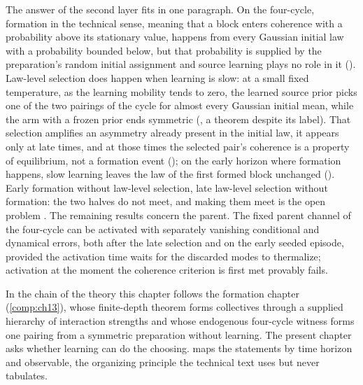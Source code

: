 The answer of the second layer fits in one paragraph. On the four-cycle, formation in the technical
sense, meaning that a block enters coherence with a probability above its stationary value, happens
from every Gaussian initial law with a probability bounded below, but that probability is supplied by
the preparation's random initial assignment and source learning plays no role in it
(). Law-level selection does happen when learning is slow: at a
small fixed temperature, as the learning mobility tends to zero, the learned source prior picks one of
the two pairings of the cycle for almost every Gaussian initial mean, while the arm with a frozen prior
ends symmetric (, a theorem despite its label). That selection
amplifies an asymmetry already present in the initial law, it appears only at late times, and at those
times the selected pair's coherence is a property of equilibrium, not a formation event
(); on the early horizon where formation happens, slow learning
leaves the law of the first formed block unchanged (). Early formation
without law-level selection, late law-level selection without formation: the two halves do not meet,
and making them meet is the open problem . The remaining results
concern the parent. The fixed parent channel of the four-cycle can be activated with separately
vanishing conditional and dynamical errors, both after the late selection and on the early seeded
episode, provided the activation time waits for the discarded modes to thermalize; activation at the
moment the coherence criterion is first met provably fails.

In the chain of the theory this chapter follows the formation chapter (\cref{comp:ch13}), whose
finite-depth theorem forms collectives through a supplied hierarchy of interaction strengths and whose
endogenous four-cycle witness forms one pairing from a symmetric preparation without learning. The
present chapter asks whether learning can do the choosing.  maps the
statements by time horizon and observable, the organizing principle the technical text uses but never
tabulates.

